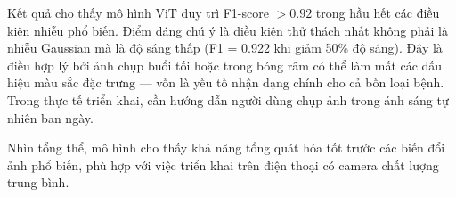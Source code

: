 Kết quả cho thấy mô hình ViT duy trì F1-score $> 0.92$ trong hầu hết các điều kiện nhiễu phổ biến. Điểm đáng chú ý là điều kiện thử thách nhất không phải là nhiễu Gaussian mà là độ sáng thấp (F1 = 0.922 khi giảm 50\% độ sáng). Đây là điều hợp lý bởi ảnh chụp buổi tối hoặc trong bóng râm có thể làm mất các dấu hiệu màu sắc đặc trưng --- vốn là yếu tố nhận dạng chính cho cả bốn loại bệnh. Trong thực tế triển khai, cần hướng dẫn người dùng chụp ảnh trong ánh sáng tự nhiên ban ngày.

Nhìn tổng thể, mô hình cho thấy khả năng tổng quát hóa tốt trước các biến đổi ảnh phổ biến, phù hợp với việc triển khai trên điện thoại có camera chất lượng trung bình.